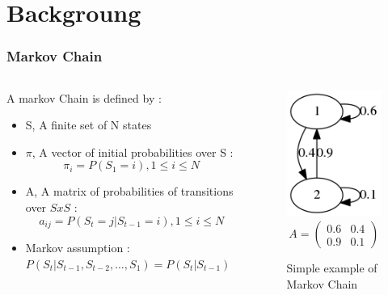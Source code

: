 \documentclass{beamer}
\begin{document}
\section{Backgroung}
\begin{frame}
  \frametitle{Markov Chain}
  \begin{columns}[T]
    \begin{column}{.7\textwidth}
      A markov Chain is defined by :
      \begin{itemize}[label=.]
      \item S, A finite set of N states
      \item $\pi$, A vector of initial probabilities over S :
        $$\pi_i = P(S_1 = i), 1 \leq i \leq N$$
      \item A, A matrix of probabilities of transitions over $SxS$ :
        $$a_{ij} = P(S_t = j | S_{t-1} = i), 1 \leq i \leq N$$
      \item Markov assumption :
        $P(S_t|S_{t-1},S_{t-2},\ldots,S_{1})=P(S_t|S_{t-1})$ 
      \end{itemize}
    \end{column}
    \begin{column}{.28\textwidth}
      \begin{figure}
        \includegraphics[scale=0.4]{img/markov_chain_example.png}
        $$
        A = \begin{pmatrix}
          0.6 & 0.4 \\
          0.9 & 0.1
        \end{pmatrix}
        $$
        \caption{Simple example of Markov Chain}
      \end{figure}
    \end{column}
  \end{columns}
\end{frame}
\end{document}
